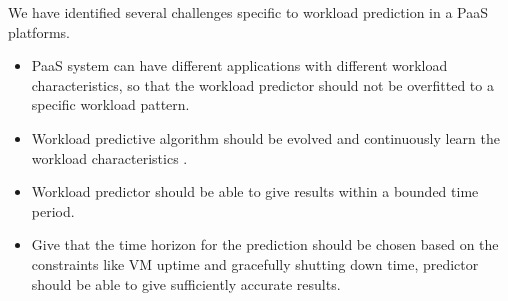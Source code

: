 We have identified several challenges specific to workload prediction in a PaaS platforms.
\begin{itemize}
\item PaaS system can have different applications with different workload characteristics, so that the workload predictor should not be overfitted to a specific workload pattern.
\end{itemize}
\begin{itemize}
\item Workload predictive algorithm should be evolved and continuously learn the workload characteristics . 
\end{itemize}
\begin{itemize}
\item Workload predictor should be able to give results within a bounded time period.
\end{itemize}
\begin{itemize}
\item Give that the  time horizon for the prediction should be chosen based on the constraints like VM uptime and gracefully shutting down time, predictor should be able to give sufficiently accurate results.
\end{itemize}


